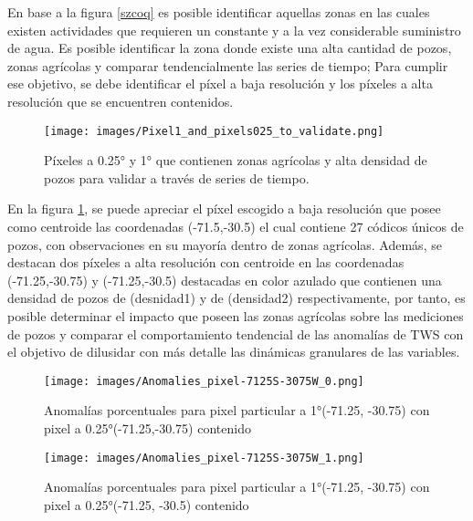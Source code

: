 En base a la figura \ref{szcoq} es posible identificar aquellas zonas en las cuales existen actividades que requieren un constante y a la vez considerable suministro de agua. Es posible identificar la zona donde existe una alta cantidad de pozos, zonas agrícolas y comparar
tendencialmente las series de tiempo; Para cumplir ese objetivo, se debe identificar el píxel a baja resolución y los píxeles a alta resolución que se encuentren contenidos.

\begin{figure}[H]
    \centering
          \texttt{[image: images/Pixel1\_and\_pixels025\_to\_validate.png]}
          \vskip -0.1in
    \caption[Píxeles a 0.25° y 1° que contienen zonas agrícolas y alta densidad de pozos]{\footnotesize Píxeles a 0.25° y 1° que contienen zonas agrícolas y alta densidad de pozos para validar a través de series de tiempo.}
    \label{pixelscoq}
\end{figure}

En la figura \ref{pixelscoq}, se puede apreciar el píxel escogido a baja resolución que posee como centroide las coordenadas (-71.5,-30.5) el cual contiene 27 códicos únicos de pozos, con observaciones en su mayoría dentro de zonas agrícolas. Además, se destacan dos píxeles a alta resolución con centroide en las coordenadas (-71.25,-30.75) y (-71.25,-30.5) 
destacadas en color azulado que contienen una densidad de pozos de (desnidad1) y de (densidad2) respectivamente, por tanto, es posible determinar el impacto
que poseen las zonas agrícolas sobre las mediciones de pozos y comparar el comportamiento tendencial de las anomalías de TWS con el objetivo de dilusidar con más detalle las dinámicas granulares de las variables.

\begin{figure}[H]
    \centering
          \texttt{[image: images/Anomalies\_pixel-7125S-3075W\_0.png]}
          \vskip -0.1in
    \caption[Series de tiempo para pixel particular a 1° con pixel a 0.25° contenido]{\footnotesize Anomalías porcentuales para pixel particular a 1°(-71.25, -30.75) con pixel a 0.25°(-71.25,-30.75) contenido}
    \label{tspixel0}
\end{figure}


\begin{figure}[H]
    \centering
          \texttt{[image: images/Anomalies\_pixel-7125S-3075W\_1.png]}
          \vskip -0.1in
    \caption[Series de tiempo para pixel particular a 1° con pixel a 0.25° contenido]{\footnotesize Anomalías porcentuales para pixel particular a 1°(-71.25, -30.75) con pixel a 0.25°(-71.25, -30.5) contenido}
    \label{tspixel1}
\end{figure}


